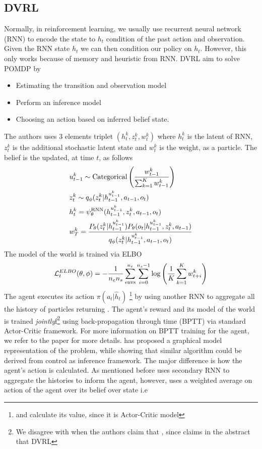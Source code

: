 \subsection{DVRL}
Normally, in reinforcement learning, we usually use recurrent neural network (RNN) to encode the state to $h_t$ condition of the past action and observation. Given the RNN state $h_t$ we can then condition our policy on $h_t$. However, this only works because of memory and heuristic from RNN. DVRL aim to solve POMDP by 
\begin{itemize}
    \item Estimating the transition and observation model 
    \item Perform an inference model 
    \item Choosing an action based on inferred belief state.
\end{itemize}
The authors uses 3 elements triplet $(h^k_t, z^k_t, w^k_t)$ where $h^k_t$ is the latent of RNN, $z^k_t$ is the additional stochastic latent state and $w^k_t$ is the weight, as a particle. The belief is the updated, at time $t$, as follows 
\begin{equation}
\begin{aligned}
    &u^k_{t-1} \sim \text{Categorical}\left( \frac{w^k_{t-1}}{\sum^K_{k=1}w^k_{t-1}} \right) \\
    &z^k_{t} \sim q_{\phi}(z^k_t | h^{u^k_{t-1}}_{t-1}, a_{t-1}, o_t) \\
    &h^k_t = \psi^{\text{RNN}}_\theta (h^{u^k_{t-1}}_{t-1}, z^k_t, a_{t-1}, o_t) \\
    &w^k_T = \frac{P_\theta(z^k_t | h^{u^k_{t-1}}_{t-1}) P_\theta(o_t | h^{u^k_{t-1}}_{t-1}, z^k_t, a_{t-1})}{q_\phi(z^k_t | h^{u^k_{t-1}}_{t-1}, a_{t-1}, o_t)}
\end{aligned}
\end{equation}
The model of the world is trained via ELBO 
\begin{equation}
    \mathcal{L}^{ELBO}_{t}(\theta, \phi) = -\frac{1}{n_en_s} \sum^{n_e}_{\text{envs}} \sum^{n_s - 1}_{i=0} \log \left( \frac{1}{K}\sum^K_{k=1}w^k_{t+i} \right)
\end{equation}
The agent executes its action $\pi(a_t | \hat{h}_t)$ \footnote{and calculate its value, since it is Actor-Critic model} by using another RNN to aggregate all the history of particles returning . The agent's reward and its model of the world is trained \textit{jointly}f\footnote{We disagree with \cite{huangsvqn} when the authors claim that \cite{igl2018deep} , since \cite{igl2018deep} claims in the abstract that DVRL } using back-propagation through time (BPTT) via standard Actor-Critic framework. For more information on BPTT training for the agent, we refer to the paper for more details. \cite{shvechikovjoint} has proposed a graphical model representation of the problem, while showing that similar algorithm could be derived from control as inference framework. The major difference is how the agent's action is calculated. As mentioned before \cite{igl2018deep} uses secondary RNN to aggregate the histories to inform the agent, however, \cite{shvechikovjoint} uses a weighted average on action of the agent over its belief over state i.e
